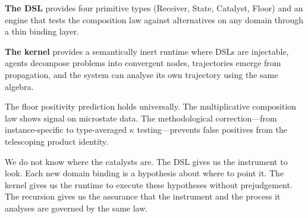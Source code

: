 \documentclass[11pt,a4paper]{article}
\theoremstyle{definition}
\theoremstyle{remark}
\begin{document}
\textbf{The DSL} provides four primitive types (Receiver, State, Catalyst, Floor) and an engine that tests the composition law against alternatives on any domain through a thin binding layer.

\textbf{The kernel} provides a semantically inert runtime where DSLs are injectable, agents decompose problems into convergent nodes, trajectories emerge from propagation, and the system can analyse its own trajectory using the same algebra.

The floor positivity prediction holds universally. The multiplicative composition law shows signal on microstate data. The methodological correction---from instance-specific to type-averaged $\kappa$ testing---prevents false positives from the telescoping product identity.

We do not know where the catalysts are. The DSL gives us the instrument to look. Each new domain binding is a hypothesis about where to point it. The kernel gives us the runtime to execute these hypotheses without prejudgement. The recursion gives us the assurance that the instrument and the process it analyses are governed by the same law.
\end{document}
